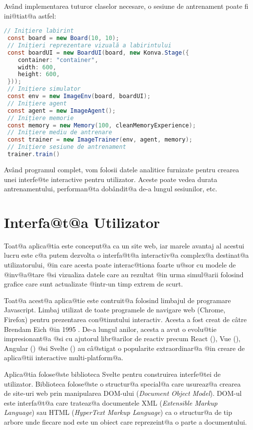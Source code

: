 Av\^ and implementarea tuturor claselor necesare, o sesiune de antrenament poate fi ini@tiat@a astfel:

\begin{lstlisting}[language=Java, caption={Inițierea unei sesiuni complete de antrenament}]
 // Inițiere labirint
 const board = new Board(10, 10);
 // Inițieri reprezentare vizuală a labirintului
 const boardUI = new BoardUI(board, new Konva.Stage({
	container: "container",
	width: 600,
	height: 600,
 }));
 // Inițiere simulator
 const env = new ImageEnv(board, boardUI);
 // Inițiere agent
 const agent = new ImageAgent();
 // Inițiere memorie
 const memory = new Memory(100, cleanMemoryExperience);
 // Inițiere mediu de antrenare
 const trainer = new ImageTrainer(env, agent, memory);
 // Inițiere sesiune de antrenament
 trainer.train()
\end{lstlisting}

Av\^ and programul complet, vom folosii datele analitice furnizate pentru crearea unei interfe@te interactive pentru utilizator. Aceste poate vedea durata antrenamentului, performan@ta dob\^ andit@a de-a lungul sesiunilor, etc.

\section{Interfa@t@a Utilizator}

Toat@a aplica@tia este conceput@a ca un site web, iar marele avantaj al acestui lucru este c@a putem dezvolta o interfa@t@a interactiv@a complex@a destinat@a utilizatorului, @in care acesta poate interac@tiona foarte u@sor cu modele de @inv@a@tare @si vizualiza datele care au rezultat @in urma simul@arii folosind grafice care sunt actualizate @intr-un timp extrem de scurt.

Toat@a acest@a aplica@tie este contruit@a folosind limbajul de programare Javascript. Limbaj utilizat de toate programele de navigare web (Chrome, Firefox) pentru prezentarea con@tinutului interactiv. Acesta a fost creat de c\^ atre Brendam Eich @in 1995 \cite{netscape}. De-a lungul anilor, acesta a avut o evolu@tie impresionant@a @si cu ajutorul libr@arilor de reactiv precum React (\cite{React}), Vue (\cite{Vue}), Angular (\cite{Angular}) @si Svelte (\cite{Svelte}) au c\^ a@stigat o popularite extraordinar@a @in creare de aplica@tii interactive multi-platform@a.

Aplica@tia folose@ste biblioteca Svelte pentru construirea interfe@tei de utilizator. Biblioteca folose@ste o structur@a special@a care usureaz@a crearea de site-uri web prin manipularea DOM-ului (\textsl{Document Object Model}). DOM-ul este interfa@t@a care trateaz@a documentele XML (\textsl{Extensible Markup Language}) sau HTML (\textsl{HyperText Markup Language}) ca o structur@a de tip arbore unde fiecare nod este un obiect care reprezeint@a o parte a documentului.

